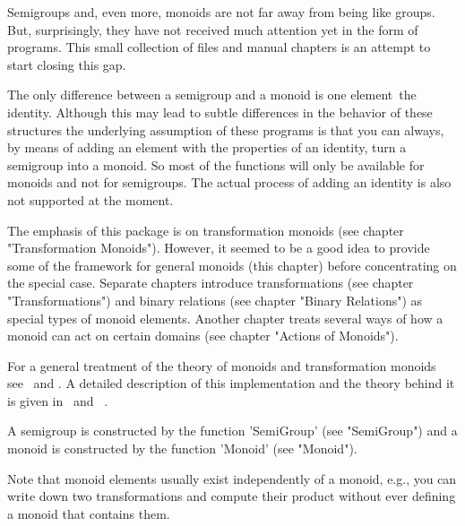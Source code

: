 
Semigroups and, even  more,  monoids are not  far  away  from being  like
groups.  But, surprisingly, they have not  received much attention yet in
the form  of {\GAP} programs.  This  small collection of files and manual
chapters is an attempt to start closing this gap.

The only difference  between a semigroup  and a monoid is one  element\:\ 
the  identity.  Although this   may  lead to   subtle differences in  the
behavior of these structures the underlying  assumption of these programs
is that you can always, by means of adding an element with the properties
of an identity, turn a semigroup into a monoid.  So most of the functions
will only be available  for monoids and not  for semigroups.   The actual
process of adding an identity is also not supported at the moment.

The emphasis of  this package is on  transformation monoids (see  chapter
"Transformation  Monoids").   However, it seemed  to  be a  good idea to
provide  some of the framework for  general monoids (this chapter) before
concentrating on   the   special  case.    Separate   chapters  introduce
transformations (see chapter "Transformations") and binary relations (see
chapter "Binary Relations") as special types of monoid elements.  Another
chapter treats  several ways of how a  monoid can  act on certain domains
(see chapter "Actions of Monoids").

For  a general treatment  of  the theory  of  monoids and  transformation
monoids   see~\cite{Lallement79}  and   \cite{Howie95}.      A   detailed
description  of  this implementation and   the theory behind  it is given
in~\cite{LPRR1} and ~\cite{LPRR2}.

A semigroup is constructed by the  function 'SemiGroup' (see "SemiGroup")
and a monoid is constructed by the function 'Monoid' (see "Monoid").

Note that monoid elements usually  exist independently of a monoid, e.g.,
you can write down two transformations  and compute their product without
ever defining a monoid that contains them.


